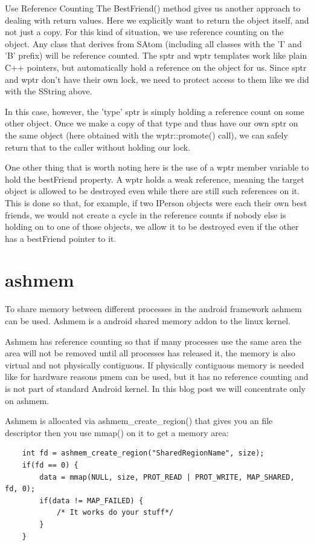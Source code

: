 \documentclass[a4paper,11pt]{article}
\begin{document}
Use Reference Counting
The BestFriend() method gives us another approach to dealing with return values. Here we explicitly want to return the object itself, and not just a copy. For this kind of situation, we use reference counting on the object.
Any class that derives from SAtom (including all classes with the 'I' and 'B' prefix) will be reference counted. The sptr and wptr templates work like plain C++ pointers, but automatically hold a reference on the object for us. Since sptr and wptr don't have their own lock, we need to protect access to them like we did with the SString above.

In this case, however, the 'type' sptr is simply holding a reference count on some other object. Once we make a copy of that type and thus have our own sptr on the same object (here obtained with the wptr::promote() call), we can safely return that to the caller without holding our lock.

One other thing that is worth noting here is the use of a wptr member variable to hold the bestFriend property. A wptr holds a weak reference, meaning the target object is allowed to be destroyed even while there are still such references on it. This is done so that, for example, if two IPerson objects were each their own best friends, we would not create a cycle in the reference counts if nobody else is holding on to one of those objects, we allow it to be destroyed even if the other has a bestFriend pointer to it.


\section{ashmem}
To share memory between different processes in the android framework ashmem
can be used. Ashmem is a android shared memory addon to the linux kernel.

Ashmem has reference counting so that if many processes use the same area the
area will not be removed until all processes has released it, the memory is
also virtual and not physically contiguous. If physically contiguous memory is
needed like for hardware reasons pmem can be used, but it has no reference
counting and is not part of standard Android kernel.
In this blog post we will concentrate only on ashmem.

Ashmem is allocated via ashmem_create_region() that gives you an file
descriptor then you use mmap() on it to get a memory area:
\begin{lstlisting}
    int fd = ashmem_create_region("SharedRegionName", size);
    if(fd == 0) {
        data = mmap(NULL, size, PROT_READ | PROT_WRITE, MAP_SHARED, fd, 0);
        if(data != MAP_FAILED) {
            /* It works do your stuff*/
        }
    }
\end{lstlisting}
\end{document}
